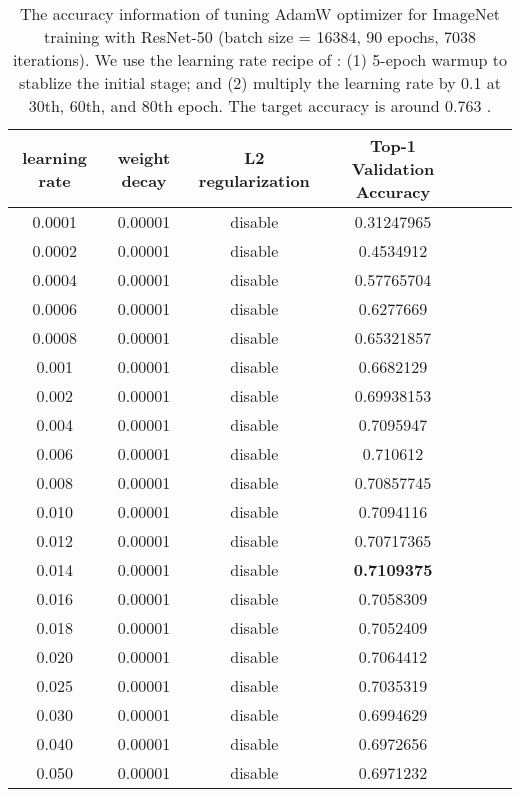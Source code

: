 \documentclass{article} \usepackage{iclr2020_conference,times}
\begin{document}
\begin{table}[ht]
\renewcommand{\arraystretch}{1.3}
\caption{The accuracy information of tuning AdamW optimizer for ImageNet training with ResNet-50 (batch size = 16384, 90 epochs, 7038 iterations). We use the learning rate recipe of \citep{goyal2017accurate}: (1) 5-epoch warmup to stablize the initial stage; and (2) multiply the learning rate by 0.1 at 30th, 60th, and 80th epoch. The target accuracy is around 0.763 \citep{goyal2017accurate}.}
\centering
\begin{tabular}{|c|c|c|c|c|c|c|}
\hline
learning rate & weight decay & L2 regularization & Top-1 Validation Accuracy \\
\hline
\hline
0.0001 & 0.00001 & disable & 0.31247965 \\
\hline
0.0002 & 0.00001 & disable & 0.4534912 \\
\hline
0.0004 & 0.00001 & disable & 0.57765704 \\
\hline
0.0006 & 0.00001 & disable & 0.6277669 \\
\hline
0.0008 & 0.00001 & disable & 0.65321857 \\
\hline
0.001 & 0.00001 & disable & 0.6682129 \\
\hline
0.002 & 0.00001 & disable & 0.69938153 \\
\hline
0.004 & 0.00001 & disable & 0.7095947 \\
\hline
0.006 & 0.00001 & disable & 0.710612 \\
\hline
0.008 & 0.00001 & disable & 0.70857745 \\
\hline
0.010 & 0.00001 & disable & 0.7094116 \\
\hline
0.012 & 0.00001 & disable & 0.70717365 \\
\hline
0.014 & 0.00001 & disable & {\bf 0.7109375} \\
\hline
0.016 & 0.00001 & disable & 0.7058309 \\
\hline
0.018 & 0.00001 & disable & 0.7052409 \\
\hline
0.020 & 0.00001 & disable & 0.7064412 \\
\hline
0.025 & 0.00001 & disable & 0.7035319 \\
\hline
0.030 & 0.00001 & disable & 0.6994629 \\
\hline
0.040 & 0.00001 & disable & 0.6972656 \\
\hline
0.050 & 0.00001 & disable & 0.6971232 \\
\hline
\end{tabular}
\label{table:imagenet_adam_tuning_nol2_3}
\end{table} 
\end{document}
